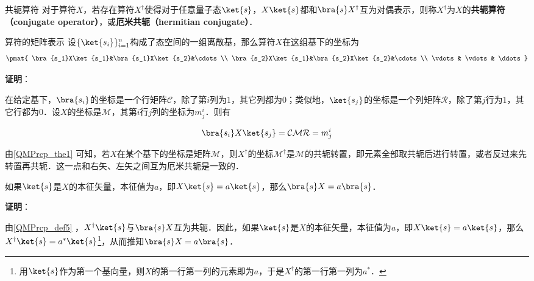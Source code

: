 \begin{definition}{共轭算符}\label{QMPrcp_def5}
对于算符$X$，若存在算符$X^\dagger$使得对于任意量子态$\ket{s}$，$X\ket{s}$都和$\bra{s}X^\dagger$互为对偶表示，则称$X^\dagger$为$X$的\textbf{共轭算符（conjugate operator）}，或\textbf{厄米共轭（hermitian conjugate）}．
\end{definition}





\begin{theorem}{算符的矩阵表示}\label{QMPrcp_the1}
设$\{\ket{s_i}\}_{i=1}^n$构成了态空间的一组离散基，那么算符$X$在这组基下的坐标为
\begin{equation}
\pmat{
    \bra{s_1}X\ket{s_1}&\bra{s_1}X\ket{s_2}&\cdots\\
    \bra{s_2}X\ket{s_1}&\bra{s_2}X\ket{s_2}&\cdots\\
    \vdots & \vdots& \ddots
}
\end{equation}
\end{theorem}

\textbf{证明}：

在给定基下，$\bra{s_i}$的坐标是一个行矩阵$\mathcal{C}$，除了第$i$列为$1$，其它列都为$0$；类似地，$\ket{s_j}$的坐标是一个列矩阵$\mathcal{R}$，除了第$j$行为$1$，其它行都为$0$．设$X$的坐标是$\mathcal{M}$，其第$i$行$j$列的坐标为$m^i_j$．则有

\begin{equation}
\bra{s_i}X\ket{s_j} = \mathcal{CMR} = m^i_j
\end{equation}







由\autoref{QMPrcp_the1} 可知，若$X$在某个基下的坐标是矩阵$\mathcal{M}$，则$X^\dagger$的坐标$\mathcal{M}^\dagger$是$\mathcal{M}$的共轭转置，即元素全部取共轭后进行转置，或者反过来先转置再共轭．这一点和右矢、左矢之间互为厄米共轭是一致的．






\begin{lemma}{}\label{QMPrcp_lem1}
如果$\ket{s}$是$X$的本征矢量，本征值为$a$，即$X\ket{s}=a\ket{s}$，那么$\bra{s}X=a\bra{s}$．
\end{lemma}

\textbf{证明}：

由\autoref{QMPrcp_def5} ，$X^\dagger\ket{s}$与$\bra{s}X$互为共轭．因此，如果$\ket{s}$是$X$的本征矢量，本征值为$a$，即$X\ket{s}=a\ket{s}$，那么$X^\dagger\ket{s}=a^*\ket{s}$\footnote{用$\ket{s}$作为第一个基向量，则$X$的第一行第一列的元素即为$a$，于是$X^\dagger$的第一行第一列为$a^*$．}，从而推知$\bra{s}X=a\bra{s}$．

